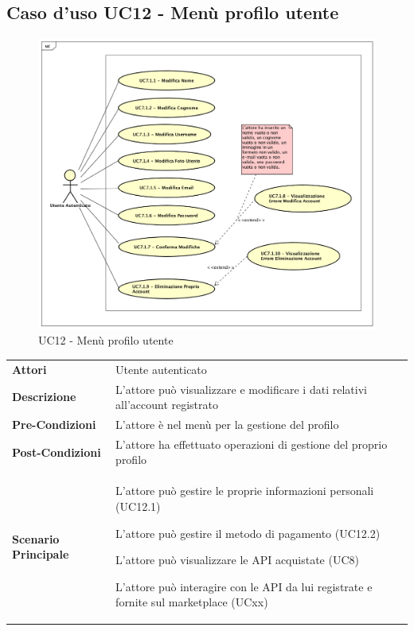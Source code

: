 \newpage
\subsection{Caso d'uso UC12 - Menù profilo utente}
\label{UC12}

\begin{figure}[ht]
	\centering
	\includegraphics[scale=0.45]{UML/UC7_1.png}
	\caption{UC12 - Menù profilo utente}
\end{figure}
\FloatBarrier
\begin{longtable}{ l | p{11cm}}
	\hline
	\rowcolor{Gray}
	 \multicolumn{2}{c}{UC12 - Menù profilo utente} \\
	 \hline
	 \textbf{Attori} & Utente autenticato  \\
	\textbf{Descrizione} & L’attore può visualizzare e modificare i dati relativi all'account registrato \\
	\textbf{Pre-Condizioni} & L’attore è nel menù per la gestione del profilo \\
	\textbf{Post-Condizioni} & L’attore ha effettuato operazioni di gestione del proprio profilo \\
	\textbf{Scenario Principale} & 
	\begin{enumerate*}[label=(\arabic*.),itemjoin={\newline}]
		\item L'attore può gestire le proprie informazioni personali (UC12.1)
		\item L'attore può gestire il metodo di pagamento (UC12.2)
		\item L'attore può visualizzare le API acquistate (UC8)
		\item L'attore può interagire con le API da lui registrate e fornite sul marketplace (UCxx)
	\end{enumerate*}\\
\end{longtable}

